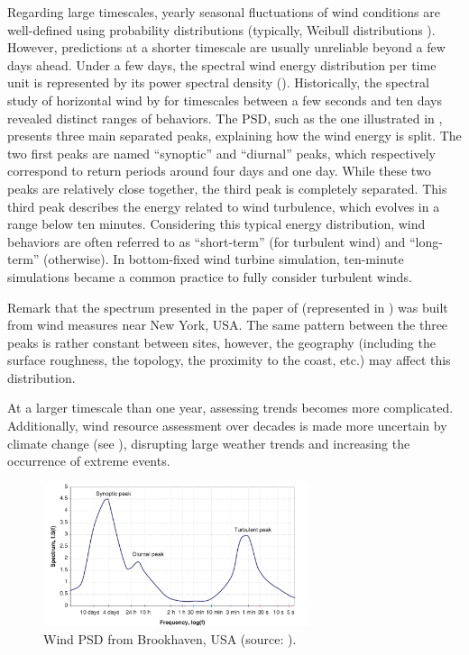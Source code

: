 Regarding large timescales, yearly seasonal fluctuations of wind conditions are well-defined using probability distributions (typically, Weibull distributions \citealp{burton_2021_wind_handbook}). 
However, predictions at a shorter timescale are usually unreliable beyond a few days ahead. 
Under a few days, the spectral wind energy distribution per time unit is represented by its power spectral density (). 
Historically, the spectral study of horizontal wind by \citet{van_1957_wind_psd} for timescales between a few seconds and ten days revealed distinct ranges of behaviors. 
The PSD, such as the one illustrated in , presents three main separated peaks, explaining how the wind energy is split. 
The two first peaks are named ``synoptic'' and ``diurnal'' peaks, which respectively correspond to return periods around four days and one day. 
While these two peaks are relatively close together, the third peak is completely separated. 
This third peak describes the energy related to wind turbulence, which evolves in a range below ten minutes. 
Considering this typical energy distribution, wind behaviors are often referred to as ``short-term'' (for turbulent wind) and ``long-term'' (otherwise). 
In bottom-fixed wind turbine simulation, ten-minute simulations became a common practice to fully consider turbulent winds. 

Remark that the spectrum presented in the paper of \citet{van_1957_wind_psd} (represented in ) was built from wind measures near New York, USA. 
The same pattern between the three peaks is rather constant between sites, however, the geography (including the surface roughness, the topology, the proximity to the coast, etc.) may affect this distribution. 

At a larger timescale than one year, assessing trends becomes more complicated. 
Additionally, wind resource assessment over decades is made more uncertain by climate change (see \citealp{nagababu_2023_climate_change}), disrupting large weather trends and increasing the occurrence of extreme events. 

\begin{figure}
    \centering
    \includegraphics[width=0.7\textwidth]{./part1/figures/wind_spectrum.png}
    \caption{Wind PSD from Brookhaven, USA (source: \citealp{burton_2021_wind_handbook}).}
    \label{fig:wind_psd}
\end{figure}





